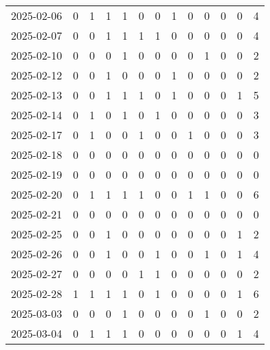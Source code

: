 \documentclass[dvipdfmx,oneside]{article}
\begin{document}
\begin{longtable}{lcccccccccccc}
        2025-02-06 &     0 &     1 &     1 &     1 &     0 &     0 &     1 &     0 &     0 &     0 &     0 &      4 \\
        2025-02-07 &     0 &     0 &     1 &     1 &     1 &     1 &     0 &     0 &     0 &     0 &     0 &      4 \\
        2025-02-10 &     0 &     0 &     0 &     1 &     0 &     0 &     0 &     0 &     1 &     0 &     0 &      2 \\
        2025-02-12 &     0 &     0 &     1 &     0 &     0 &     0 &     1 &     0 &     0 &     0 &     0 &      2 \\
        2025-02-13 &     0 &     0 &     1 &     1 &     1 &     0 &     1 &     0 &     0 &     0 &     1 &      5 \\
        2025-02-14 &     0 &     1 &     0 &     1 &     0 &     1 &     0 &     0 &     0 &     0 &     0 &      3 \\
        2025-02-17 &     0 &     1 &     0 &     0 &     1 &     0 &     0 &     1 &     0 &     0 &     0 &      3 \\
        2025-02-18 &     0 &     0 &     0 &     0 &     0 &     0 &     0 &     0 &     0 &     0 &     0 &      0 \\
        2025-02-19 &     0 &     0 &     0 &     0 &     0 &     0 &     0 &     0 &     0 &     0 &     0 &      0 \\
        2025-02-20 &     0 &     1 &     1 &     1 &     1 &     0 &     0 &     1 &     1 &     0 &     0 &      6 \\
        2025-02-21 &     0 &     0 &     0 &     0 &     0 &     0 &     0 &     0 &     0 &     0 &     0 &      0 \\
        2025-02-25 &     0 &     0 &     1 &     0 &     0 &     0 &     0 &     0 &     0 &     0 &     1 &      2 \\
        2025-02-26 &     0 &     0 &     1 &     0 &     0 &     1 &     0 &     0 &     1 &     0 &     1 &      4 \\
        2025-02-27 &     0 &     0 &     0 &     0 &     1 &     1 &     0 &     0 &     0 &     0 &     0 &      2 \\
        2025-02-28 &     1 &     1 &     1 &     1 &     0 &     1 &     0 &     0 &     0 &     0 &     1 &      6 \\
        2025-03-03 &     0 &     0 &     0 &     1 &     0 &     0 &     0 &     0 &     1 &     0 &     0 &      2 \\
        2025-03-04 &     0 &     1 &     1 &     1 &     0 &     0 &     0 &     0 &     0 &     0 &     1 &      4 \\

\end{longtable}
\end{document}
